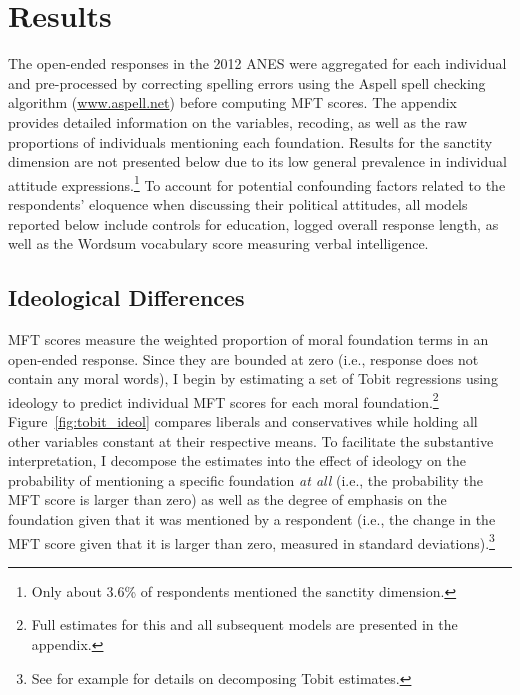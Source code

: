\documentclass[12pt]{article}
\begin{document}
\section*{Results}

The open-ended responses in the 2012 ANES were aggregated for each individual and pre-processed by correcting spelling errors using the Aspell spell checking algorithm (\url{www.aspell.net}) before computing MFT scores. The appendix provides detailed information on the variables, recoding, as well as the raw proportions of individuals mentioning each foundation. Results for the sanctity dimension are not presented below due to its low general prevalence in individual attitude expressions.\footnote{Only about 3.6\% of respondents mentioned the sanctity dimension.} To account for potential confounding factors related to the respondents' eloquence when discussing their political attitudes, all models reported below include controls for education, logged overall response length, as well as the Wordsum vocabulary score measuring verbal intelligence.




\subsection*{Ideological Differences}

MFT scores measure the weighted proportion of moral foundation terms in an open-ended response. Since they are bounded at zero (i.e., response does not contain any moral words), I begin by estimating a set of Tobit regressions using ideology to predict individual MFT scores for each moral foundation.\footnote{Full estimates for this and all subsequent models are presented in the appendix.} Figure~\ref{fig:tobit_ideol} compares liberals and conservatives while holding all other variables constant at their respective means. To facilitate the substantive interpretation, I decompose the estimates into the effect of ideology on the probability of mentioning a specific foundation \textit{at all} (i.e., the probability the MFT score is larger than zero) as well as the degree of emphasis on the foundation given that it was mentioned by a respondent (i.e., the change in the MFT score given that it is larger than zero, measured in standard deviations).\footnote{See for example \citet{mcdonald1980uses} for details on decomposing Tobit estimates.}
\end{document}
